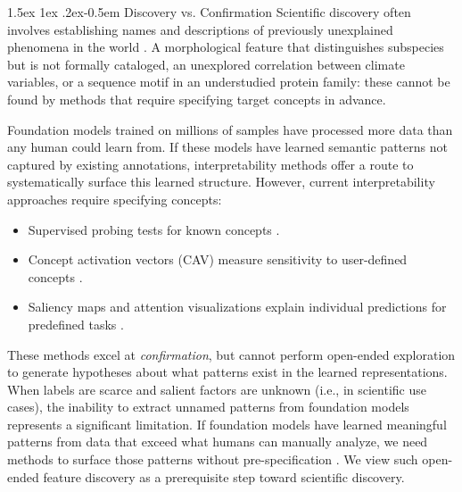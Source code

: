 \documentclass{article}
\makeatletter
\renewcommand{\paragraph}{%
  \@startsection{paragraph}{4}%
  {\z@}{1.5ex \@plus 1ex \@minus .2ex}{-0.5em}%
  {\normalfont\normalsize\bfseries}%
}
\theoremstyle{plain}
\theoremstyle{definition}
\theoremstyle{remark}
\makeatother
\begin{document}
\paragraph{Discovery vs. Confirmation}
Scientific discovery often involves establishing names and descriptions of previously unexplained phenomena in the world \citep{kuhn1970structure}.
A morphological feature that distinguishes subspecies but is not formally cataloged, an unexplored correlation between climate variables, or a sequence motif in an understudied protein family: these cannot be found by methods that require specifying target concepts in advance.

Foundation models trained on millions of samples have processed more data than any human could learn from.
If these models have learned semantic patterns not captured by existing annotations, interpretability methods offer a route to systematically surface this learned structure.
However, current interpretability approaches require specifying concepts:
\begin{itemize}
\item{Supervised probing tests for known concepts \citep{alain2016understanding}.}
\item{Concept activation vectors (CAV) measure sensitivity to user-defined concepts \citep{kim2018tcav}.}
\item{Saliency maps and attention visualizations explain individual predictions for predefined tasks \citep{selvaraju2017gradcam,sundararajan2017axiomatic,simonyan2013deep}.}
\end{itemize}
These methods excel at \textit{confirmation}, but cannot perform open-ended exploration to generate hypotheses about what patterns exist in the learned representations.
When labels are scarce and salient factors are unknown (i.e., in scientific use cases), the inability to extract unnamed patterns from foundation models represents a significant limitation.
If foundation models have learned meaningful patterns from data that exceed what humans can manually analyze, we need methods to surface those patterns without pre-specification \citep{hughes2024open}.
We view such open-ended feature discovery as a prerequisite step toward scientific discovery.
\end{document}
